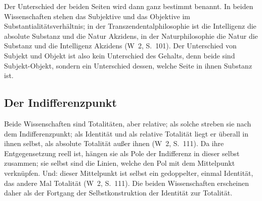 \documentclass[11pt,a4paper]{article}
\newcommand{\SO}{Subjekt-Objekt}
\newcommand{\Werke}[1]{(W~2, S.~#1)}
\begin{document}
Der Unterschied der beiden Seiten wird dann ganz bestimmt benannt. In beiden Wissenschaften stehen das Subjektive und das Objektive im Substantialitätsverhältnis; in der Transzendentalphilosophie ist die Intelligenz die absolute Substanz und die Natur Akzidens, in der Naturphilosophie die Natur die Substanz und die Intelligenz Akzidens \Werke{101}. Der Unterschied von Subjekt und Objekt ist also kein Unterschied des Gehalts, denn beide sind \SO{}, sondern ein Unterschied dessen, welche Seite in ihnen Substanz ist.

\subsection{Der Indifferenzpunkt}

Beide Wissenschaften sind Totalitäten, aber relative; als solche \glqq streben sie nach dem Indifferenzpunkt; als Identität und als relative Totalität liegt er überall in ihnen selbst, als absolute Totalität außer ihnen\grqq{} \Werke{111}. Da ihre Entgegensetzung reell ist, \glqq hängen sie als Pole der Indifferenz in dieser selbst zusammen; sie selbst sind die Linien, welche den Pol mit dem Mittelpunkt verknüpfen\grqq{}. Und: \glqq dieser Mittelpunkt ist selbst ein gedoppelter, einmal Identität, das andere Mal Totalität\grqq{} \Werke{111}. Die beiden Wissenschaften erscheinen daher als der Fortgang der Selbstkonstruktion der Identität zur Totalität.
\end{document}
